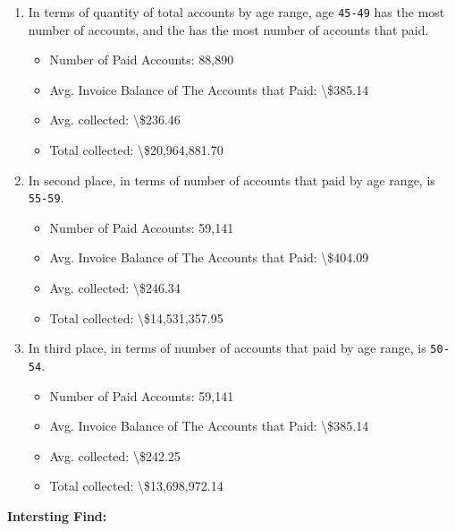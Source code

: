\documentclass[11pt]{article}
\providecommand{\tightlist}{%
      \setlength{\itemsep}{0pt}\setlength{\parskip}{0pt}}
\begin{document}
\begin{enumerate}
\def\labelenumi{\arabic{enumi}.}
\tightlist
\item
  In terms of quantity of total accounts by age range, age
  \texttt{45-49} has the most number of accounts, and the has the most
  number of accounts that paid.

  \begin{itemize}
  \tightlist
  \item
    Number of Paid Accounts: 88,890
  \item
    Avg. Invoice Balance of The Accounts that Paid:
    \textbackslash{}\$385.14
  \item
    Avg. collected: \textbackslash{}\$236.46
  \item
    Total collected: \textbackslash{}\$20,964,881.70
  \end{itemize}
\item
  In second place, in terms of number of accounts that paid by age
  range, is \texttt{55-59}.

  \begin{itemize}
  \tightlist
  \item
    Number of Paid Accounts: 59,141
  \item
    Avg. Invoice Balance of The Accounts that Paid:
    \textbackslash{}\$404.09
  \item
    Avg. collected: \textbackslash{}\$246.34
  \item
    Total collected: \textbackslash{}\$14,531,357.95
  \end{itemize}
\item
  In third place, in terms of number of accounts that paid by age range,
  is \texttt{50-54}.

  \begin{itemize}
  \tightlist
  \item
    Number of Paid Accounts: 59,141
  \item
    Avg. Invoice Balance of The Accounts that Paid:
    \textbackslash{}\$385.14
  \item
    Avg. collected: \textbackslash{}\$242.25
  \item
    Total collected: \textbackslash{}\$13,698,972.14
  \end{itemize}
\end{enumerate}

\textbf{Intersting Find:}
\end{document}
